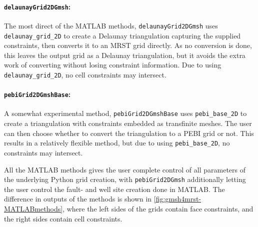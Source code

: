 \paragraph{\texttt{delaunayGrid2DGmsh}:}
The most direct of the MATLAB methods, \verb|delaunayGrid2DGmsh| uses \verb|delaunay_grid_2D| to create a Delaunay triangulation capturing the supplied constraints, then converts it to an MRST grid directly. As no conversion is done, this leaves the output grid as a Delaunay triangulation, but it avoids the extra work of converting without losing constraint information. Due to using \verb|delaunay_grid_2D|, no cell constraints may intersect.

\paragraph{\texttt{pebiGrid2DGmshBase}:}
A somewhat experimental method, \verb|pebiGrid2DGmshBase| uses \verb|pebi_base_2D| to create a triangulation with constraints embedded as transfinite meshes. The user can then choose whether to convert the triangulation to a PEBI grid or not. This results in a relatively flexible method, but due to using \verb|pebi_base_2D|, no constraints may intersect.

All the MATLAB methods gives the user complete control of all parameters of the underlying Python grid creation, with \verb|pebiGrid2DGmsh| additionally letting the user control the fault- and well site creation done in MATLAB. The difference in outputs of the methods is shown in \autoref{fig:gmsh4mrst-MATLABmethods}, where the left sides of the grids contain face constraints, and the right sides contain cell constraints.

